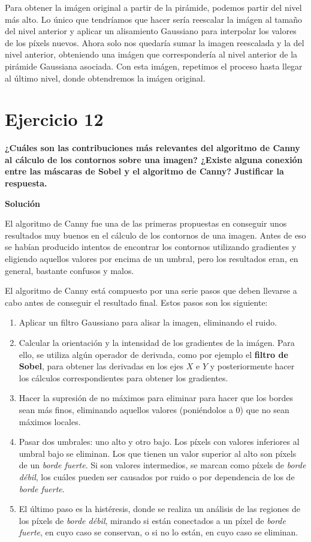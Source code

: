 \documentclass[11pt,a4paper]{article}
\newcommand{\answer}{\noindent\textbf{Solución}}
\newcommand{\question}[1]{\noindent\textbf{#1}}
\newcommand{\nonumbersection}[1]{\section*{#1}\addcontentsline{toc}{section}{#1}}
\begin{document}
Para obtener la imágen original a partir de la pirámide, podemos partir del nivel más alto. Lo único que
tendríamos que hacer sería reescalar la imágen al tamaño del nivel anterior y aplicar un alisamiento Gaussiano para
interpolar los valores de los píxels nuevos. Ahora solo nos quedaría sumar la imagen reescalada y la del nivel anterior,
obteniendo una imágen que correspondería al nivel anterior de la pirámide Gaussiana asociada. Con esta imágen, repetimos
el proceso hasta llegar al último nivel, donde obtendremos la imágen original.

\nonumbersection{Ejercicio 12}

\question{¿Cuáles son las contribuciones más relevantes del algoritmo de
Canny al cálculo de los contornos sobre una imagen? ¿Existe alguna
conexión entre las máscaras de Sobel y el algoritmo de Canny? Justificar
la respuesta.}

\answer

El algoritmo de Canny fue una de las primeras propuestas en conseguir unos resultados muy buenos en el
cálculo de los contornos de una imagen. Antes de eso se habían producido intentos de encontrar los contornos utilizando
gradientes y eligiendo aquellos valores por encima de un umbral, pero los resultados eran, en general, bastante confusos
y malos.

El algoritmo de Canny está compuesto por una serie pasos que deben llevarse a cabo antes de conseguir el resultado
final. Estos pasos son los siguiente:

\begin{enumerate}
	\item Aplicar un filtro Gaussiano para alisar la imagen, eliminando el ruido.
	\item Calcular la orientación y la intensidad de los gradientes de la imágen. Para ello, se utiliza
	algún operador de derivada, como por ejemplo el \textbf{filtro de Sobel}, para obtener las derivadas en
	los ejes $X$ e $Y$ y posteriormente hacer los cálculos correspondientes para obtener los gradientes.
	\item Hacer la supresión de no máximos para eliminar para hacer que los bordes sean más finos, eliminando
	aquellos valores (poniéndolos a 0) que no sean máximos locales.
	\item Pasar dos umbrales: uno alto y otro bajo. Los píxels con valores inferiores al umbral bajo se eliminan. Los
	que tienen un valor superior al alto son píxels de un \textit{borde fuerte}. Si son valores intermedios, se marcan
	como píxels de \textit{borde débil}, los cuáles pueden ser causados por ruido o por dependencia de los de
	\textit{borde fuerte}.
	\item El último paso es la histéresis, donde se realiza un análisis de las regiones de los píxels de \textit{borde débil},
	mirando si están conectados a un píxel de \textit{borde fuerte}, en cuyo caso se conservan, o si no lo están, en cuyo
	caso se eliminan.
\end{enumerate}
\end{document}
